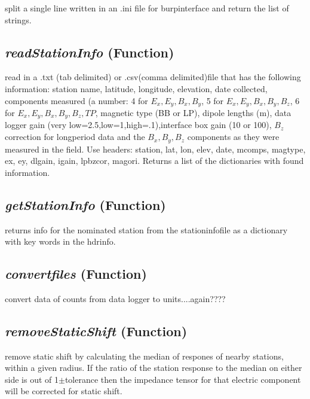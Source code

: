 split a single line written in an .ini file
    for burpinterface and return the list of strings.

\subsection{\textit{readStationInfo} (Function)}
\label{ssec:core.mttools.readStationInfo}

read in a .txt (tab 
    delimited) or .csv(comma delimited)file that has the following information: 
    station name, latitude, longitude, elevation, date collected, 
    components measured (a number: 4 for $E_x, E_y, B_x,B_y$, 5 for 
    $E_x, E_y, B_x,B_y, B_z$, 6 for $E_x, E_y, B_x,B_y, B_z, TP$, magnetic type (BB or LP), dipole 
    lengths (m), data logger gain (very low=2.5,low=1,high=.1),interface box 
    gain (10 or 100), $B_z$ correction for longperiod data and the $ B_x,B_y, B_z$ components as they were measured in the field. Use headers: station, lat, lon, elev, date, mcomps, magtype, ex, ey, dlgain, igain, lpbzcor, magori. 
    Returns a list of the dictionaries with found information.

\subsection{\textit{getStationInfo} (Function)}
\label{ssec:core.mttools.getStationInfo}

returns info for the nominated
    station from the stationinfofile as a dictionary with key words in the 
    hdrinfo.

\subsection{\textit{convertfiles} (Function)}
\label{ssec:core.mttools.convertfiles}

convert data of counts from data logger to units....again????

\subsection{\textit{removeStaticShift} (Function)}
\label{ssec:core.mttools.removeStaticShift}

remove static shift by calculating the median of respones of nearby stations, within a given radius.  If the 
    ratio of the station response to the median on either side is out of 1$\pm$tolerance then 
    the impedance tensor for that electric component will be corrected for 
    static shift.

